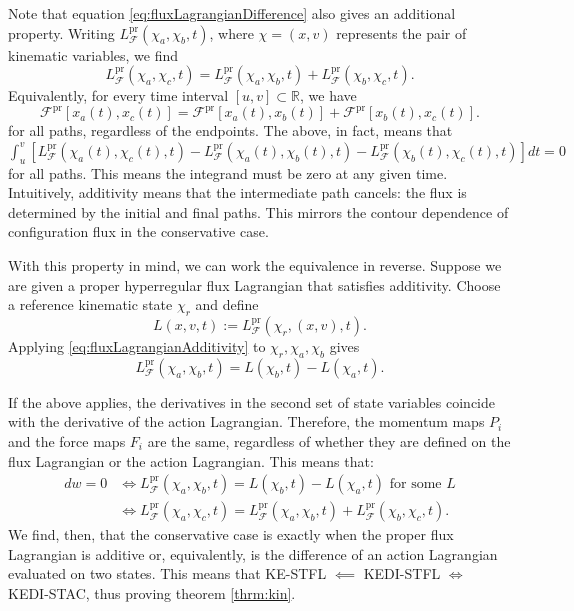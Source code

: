 \documentclass[12pt]{article}
\begin{document}
Note that equation \eqref{eq:fluxLagrangianDifference} also gives an additional
property. Writing $L_{\mathcal{F}}^{\mathrm{pr}}(\chi_a,\chi_b,t)$, where $\chi = (x, v)$ represents the pair of kinematic variables, we find
\begin{equation}\label{eq:fluxLagrangianAdditivity}
	L_{\mathcal{F}}^{\mathrm{pr}}(\chi_a,\chi_c,t)
	=
	L_{\mathcal{F}}^{\mathrm{pr}}(\chi_a,\chi_b,t)
	+
	L_{\mathcal{F}}^{\mathrm{pr}}(\chi_b,\chi_c,t).
\end{equation}
Equivalently, for every time interval $[u,v] \subset \mathbb{R}$, we have
\begin{equation}\label{eq:fluxActionAdditivity}
	\mathcal{F}^{\mathrm{pr}}[x_a(t),x_c(t)]
	=
	\mathcal{F}^{\mathrm{pr}}[x_a(t),x_b(t)]
	+
	\mathcal{F}^{\mathrm{pr}}[x_b(t),x_c(t)].
\end{equation}
for all paths, regardless of the endpoints. The above, in fact, means that $\int_u^v
\left[
L_{\mathcal{F}}^{\mathrm{pr}}(\chi_a(t),\chi_c(t),t)
-L_{\mathcal{F}}^{\mathrm{pr}}(\chi_a(t),\chi_b(t),t)
-L_{\mathcal{F}}^{\mathrm{pr}}(\chi_b(t),\chi_c(t),t)
\right]dt=0$ for all paths. This means the integrand must be zero at any given time. Intuitively, additivity means that the intermediate path cancels: the flux is determined by the initial and final paths. This mirrors the contour dependence of configuration flux in the conservative case.

With this property in mind, we can work the equivalence in reverse. Suppose we are given a proper hyperregular flux Lagrangian that satisfies additivity. Choose a reference kinematic state $\chi_r$ and
define
\begin{equation}
	L(x,v,t)
	:=
	L_{\mathcal{F}}^{\mathrm{pr}}(\chi_r,(x,v),t).
\end{equation}
Applying \eqref{eq:fluxLagrangianAdditivity} to $\chi_r,\chi_a,\chi_b$ gives
\begin{equation}
	L_{\mathcal{F}}^{\mathrm{pr}}(\chi_a,\chi_b,t)=L(\chi_b,t)-L(\chi_a,t).
\end{equation}

If the above applies, the derivatives in the second set of state variables coincide with the derivative of the action Lagrangian. Therefore, the momentum maps $P_i$ and the force maps $F_i$ are the same, regardless of whether they are defined on the flux Lagrangian or the action Lagrangian. This means that:
\begin{equation}
	\begin{aligned}
		dw=0
		&\iff
		L_{\mathcal{F}}^{\mathrm{pr}}(\chi_a,\chi_b,t)=L(\chi_b,t)-L(\chi_a,t)
		\text{ for some }L\\
		&\iff
		L_{\mathcal{F}}^{\mathrm{pr}}(\chi_a,\chi_c,t)
		=
		L_{\mathcal{F}}^{\mathrm{pr}}(\chi_a,\chi_b,t)
		+
		L_{\mathcal{F}}^{\mathrm{pr}}(\chi_b,\chi_c,t).
	\end{aligned}
\end{equation}
We find, then, that the conservative case is exactly when the proper flux Lagrangian is additive or, equivalently, is the difference of an action Lagrangian evaluated on two states. This means that KE-STFL $\impliedby$ KEDI-STFL $\iff$ KEDI-STAC, thus proving theorem \ref{thrm:kin}.
\end{document}
